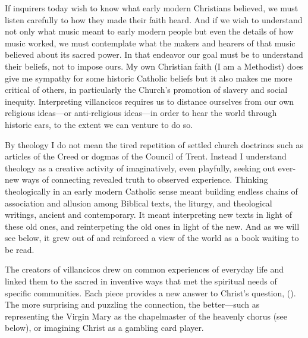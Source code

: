 If inquirers today wish to know what early modern Christians believed, we
must listen carefully to how they made their faith heard.
And if we wish to understand not only what music meant to early
modern people but even the details of how music worked, we must contemplate
what the makers and hearers of that music believed about its sacred power. 
In that endeavor our goal must be to understand their beliefs, not to impose
ours.
My own Christian faith (I am a Methodist) does give me sympathy for some
historic Catholic beliefs but it also makes me more critical of others, in
particularly the Church's promotion of slavery and social inequity.
Interpreting villancicos requires us to distance ourselves from our own
religious ideas---or anti-religious ideas---in order to hear the world through
historic ears, to the extent we can venture to do so.%
    \Autocites
    {Burstyn:PeriodEar}
    [for an example of the anti-religious approach, see][]{Menache:Vox}

By theology I do not mean the tired repetition of settled church doctrines such
as articles of the Creed or dogmas of the Council of Trent.
Instead I understand theology as a creative activity of imaginatively, even
playfully, seeking out ever-new ways of connecting revealed truth to observed
experience.
Thinking theologically in an early modern Catholic sense meant building 
endless chains of association and allusion among Biblical texts, the liturgy,
and theological writings, ancient and contemporary.
It meant interpreting new texts in light of these old ones, and reinterpeting
the old ones in light of the new.
And as we will see below, it grew out of and reinforced a view of the world as
a book waiting to be read.


The creators of villancicos drew on common experiences of everyday life and
linked them to the sacred in inventive ways that met the spiritual needs of
specific communities.
Each piece provides a new answer to Christ's question, 
().
The more surprising and puzzling the connection, the better---such as
representing the Virgin Mary as the chapelmaster of the heavenly chorus (see
below), or imagining Christ as a gambling card player.%
    \Autocite{Cashner:Cards}


